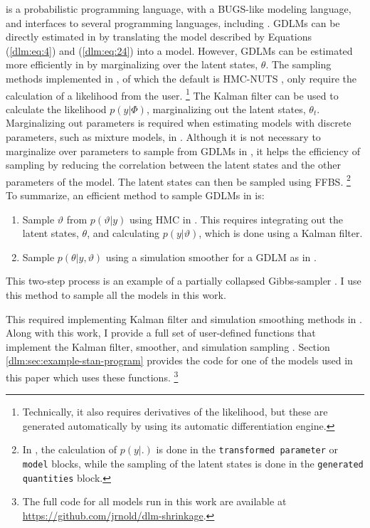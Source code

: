 \Stan{} is a probabilistic programming language, with a BUGS-like modeling language, and interfaces to several programming languages, including \RLang{} \parencites{Stan2015a}{CarpenterGelmanHoffmanEtAl2015a}.
GDLMs can be directly estimated in \Stan{} by translating the model described by Equations (\ref{dlm:eq:4}) and (\ref{dlm:eq:24}) into a \Stan{} model.
However, GDLMs can be estimated more efficiently in \Stan{} by marginalizing over the latent states, $\theta$.
The sampling methods implemented in \Stan{}, of which the default is HMC-NUTS \parencites{HoffmanGelman2014a}, only require the calculation of a likelihood from the user.%
\footnote{Technically, it also requires derivatives of the likelihood, but these are generated automatically by \Stan{} using its automatic differentiation engine.}
The Kalman filter can be used to calculate the likelihood $p(y | \Phi)$, marginalizing out the latent states, $\theta_{t}$. 
Marginalizing out parameters is required when estimating models with discrete parameters, such as mixture models, in \Stan{} \parencite[104]{Stan2015a}.
Although it is not necessary to marginalize over parameters to sample from GDLMs in \Stan{}, it helps the efficiency of sampling by reducing the correlation between the latent states and the other parameters of the model.%
The latent states can then be sampled using FFBS.
\footnote{In \Stan{}, the calculation of $p(y| .)$ is done in the \texttt{transformed parameter} or \texttt{model} blocks, while the sampling of the latent states is done in the \texttt{generated quantities} block.}
To summarize, an efficient method to sample GDLMs in \Stan{} is:
\begin{enumerate}
\item Sample $\vartheta$ from $p(\vartheta | y)$ using HMC in \Stan{}.
  This requires integrating out the latent states, $\theta$, and calculating $p(y | \vartheta)$, which is done using a Kalman filter.
\item Sample $p(\theta | y, \vartheta)$ using a simulation smoother for a GDLM as in  \parencites{CarterKohn1994}{Fruehwirth-Schnatter1994}{DeJongShephard1995}{DurbinKoopman2002}[Ch 4.9]{DurbinKoopman2012}.
\end{enumerate}
This two-step process is an example of a partially collapsed Gibbs-sampler \parencite{VanDykPark2008a}.
I use this method to sample all the models in this work.

This required implementing Kalman filter and simulation smoothing methods in \Stan{}.
Along with this work, I provide a full set of user-defined \Stan{} functions that implement the Kalman filter, smoother, and simulation sampling \textcite{Arnold2015c}.
Section \ref{dlm:sec:example-stan-program} provides the code for one of the \Stan{} models used in this paper which uses these functions.%
\footnote{The full code for all models run in this work are available at \url{https://github.com/jrnold/dlm-shrinkage}.}

